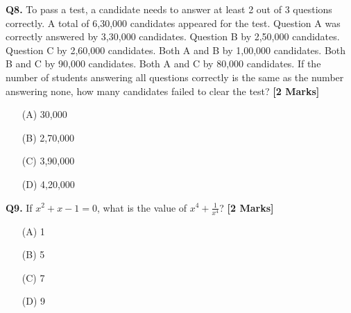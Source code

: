 \documentclass[11pt]{article}
\newcommand{\questionb}[2]{
    \noindent\textbf{Q#2.} #1 \hfill \textbf{[2 Marks]}
}
\begin{document}
\questionb{To pass a test, a candidate needs to answer at least 2 out of 3 questions correctly. A total of 6,30,000 candidates appeared for the test. Question A was correctly answered by 3,30,000 candidates. Question B by 2,50,000 candidates. Question C by 2,60,000 candidates. Both A and B by 1,00,000 candidates. Both B and C by 90,000 candidates. Both A and C by 80,000 candidates. If the number of students answering all questions correctly is the same as the number answering none, how many candidates failed to clear the test?}{8}
\begin{enumerate}
    \item[(A)] 30,000
    \item[(B)] 2,70,000
    \item[(C)] 3,90,000
    \item[(D)] 4,20,000
\end{enumerate}
\vspace{0.5cm}

\questionb{If \(x^2 + x - 1 = 0\), what is the value of \(x^4 + \frac{1}{x^4}\)?}{9}
\begin{enumerate}
    \item[(A)] 1
    \item[(B)] 5
    \item[(C)] 7
    \item[(D)] 9
\end{enumerate}
\vspace{0.5cm}
\end{document}
